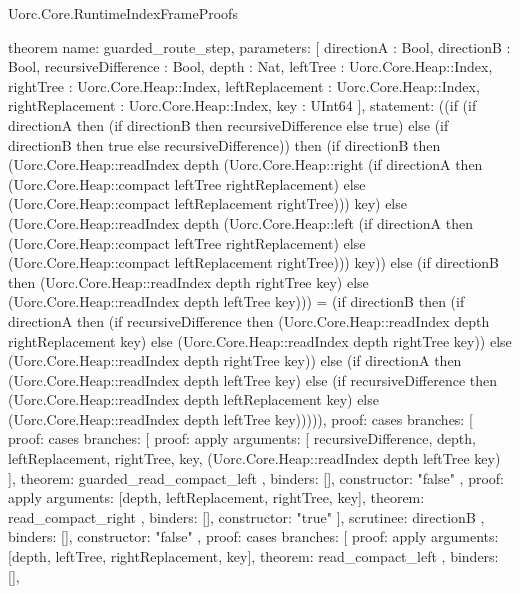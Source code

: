 \begin{lexlean}{Uorc.Core.RuntimeIndexFrameProofs}
\begin{semanticmodule}
theorem{
  name: guarded_route_step,
  parameters: [
    directionA : Bool,
    directionB : Bool,
    recursiveDifference : Bool,
    depth : Nat,
    leftTree : Uorc.Core.Heap::Index,
    rightTree : Uorc.Core.Heap::Index,
    leftReplacement : Uorc.Core.Heap::Index,
    rightReplacement : Uorc.Core.Heap::Index,
    key : UInt64
  ],
  statement: ((if (if directionA then (if directionB then recursiveDifference else true) else (if directionB then true else recursiveDifference)) then (if directionB then (Uorc.Core.Heap::readIndex depth (Uorc.Core.Heap::right (if directionA then (Uorc.Core.Heap::compact leftTree rightReplacement) else (Uorc.Core.Heap::compact leftReplacement rightTree))) key) else (Uorc.Core.Heap::readIndex depth (Uorc.Core.Heap::left (if directionA then (Uorc.Core.Heap::compact leftTree rightReplacement) else (Uorc.Core.Heap::compact leftReplacement rightTree))) key)) else (if directionB then (Uorc.Core.Heap::readIndex depth rightTree key) else (Uorc.Core.Heap::readIndex depth leftTree key))) = (if directionB then (if directionA then (if recursiveDifference then (Uorc.Core.Heap::readIndex depth rightReplacement key) else (Uorc.Core.Heap::readIndex depth rightTree key)) else (Uorc.Core.Heap::readIndex depth rightTree key)) else (if directionA then (Uorc.Core.Heap::readIndex depth leftTree key) else (if recursiveDifference then (Uorc.Core.Heap::readIndex depth leftReplacement key) else (Uorc.Core.Heap::readIndex depth leftTree key))))),
  proof: cases{
    branches: [
      {
        proof: cases{
          branches: [
            {
              proof: apply{
                arguments: [
                  recursiveDifference,
                  depth,
                  leftReplacement,
                  rightTree,
                  key,
                  (Uorc.Core.Heap::readIndex depth leftTree key)
                ],
                theorem: guarded_read_compact_left
              },
              binders: [],
              constructor: "false"
            },
            {
              proof: apply{
                arguments: [depth, leftReplacement, rightTree, key],
                theorem: read_compact_right
              },
              binders: [],
              constructor: "true"
            }
          ],
          scrutinee: directionB
        },
        binders: [],
        constructor: "false"
      },
      {
        proof: cases{
          branches: [
            {
              proof: apply{
                arguments: [depth, leftTree, rightReplacement, key],
                theorem: read_compact_left
              },
              binders: [],
}}}}}
\end{semanticmodule}
\end{lexlean}
